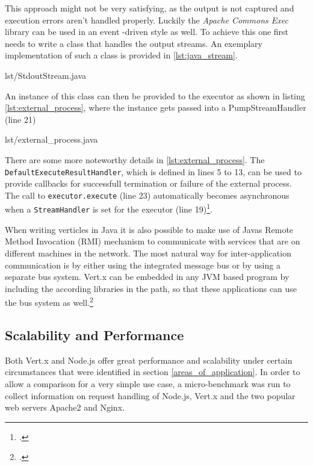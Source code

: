 This approach might not be very satisfying, as the output is not captured and
execution errors aren't handled properly. Luckily the \textit{Apache Commons Exec} library
can be used in an event -driven style as well. To achieve this one first needs to
write a class that handles the output streams.
An exemplary implementation of such a class is provided in 
\autoref{lst:java_stream}.

%
{lst/StdoutStream.java}

An instance of this class can then be provided to the executor as shown in
listing \ref{lst:external_process}, where the instance gets passed into a PumpStreamHandler (line 21)

%
{lst/external_process.java}

There are some more noteworthy details in \autoref{lst:external_process}.
The \texttt{DefaultExecuteResultHandler}, which is defined in lines 5 to
13, can be used to provide callbacks for successfull termination or failure of
the external process. The call to \texttt{executor.execute} (line 23) automatically becomes
asynchronous when a \texttt{StreamHandler} is set for the executor (line 19)\footcite[Cf.][]{apache_2010}.



When writing verticles in Java it is also possible to make use of Javas Remote
Method Invocation (RMI) mechanism to communicate with services that are on different
machines in the network.
The most natural way for inter-application communication is by either using the
integrated message bus or by using a separate bus system.
Vert.x can be embedded in any JVM based program by including the according
libraries in the path, so that these applications can use the bus system as
well.\footcite[Cf.][]{vertx_2012}



\subsection{Scalability and Performance}
\label{scalability}



Both Vert.x and Node.js offer great performance and scalability under certain
circumstances that were identified in section \ref{areas_of_application}.
In order to allow a comparison for a very simple use case, a micro-benchmark was
run to collect information on request handling of Node.js, Vert.x and the two
popular web servers Apache2 and Nginx.
